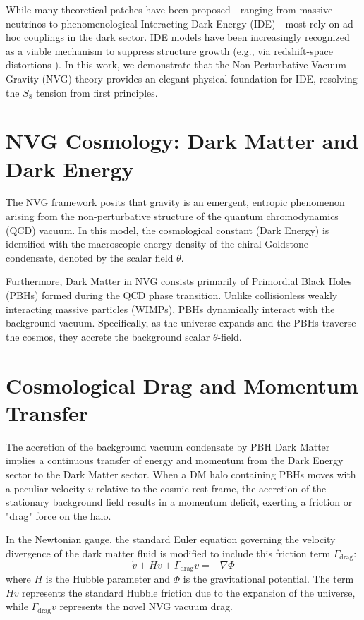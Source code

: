 \documentclass[12pt,a4paper]{article}
\begin{document}
While many theoretical patches have been proposed—ranging from massive neutrinos to phenomenological Interacting Dark Energy (IDE)—most rely on ad hoc couplings in the dark sector. IDE models have been increasingly recognized as a viable mechanism to suppress structure growth (e.g., via redshift-space distortions \cite{ide2024}). In this work, we demonstrate that the Non-Perturbative Vacuum Gravity (NVG) theory \cite{nvg2024} provides an elegant physical foundation for IDE, resolving the $S_8$ tension from first principles.

\section{NVG Cosmology: Dark Matter and Dark Energy}

The NVG framework posits that gravity is an emergent, entropic phenomenon arising from the non-perturbative structure of the quantum chromodynamics (QCD) vacuum. In this model, the cosmological constant (Dark Energy) is identified with the macroscopic energy density of the chiral Goldstone condensate, denoted by the scalar field $\theta$. 

Furthermore, Dark Matter in NVG consists primarily of Primordial Black Holes (PBHs) formed during the QCD phase transition. Unlike collisionless weakly interacting massive particles (WIMPs), PBHs dynamically interact with the background vacuum. Specifically, as the universe expands and the PBHs traverse the cosmos, they accrete the background scalar $\theta$-field.

\section{Cosmological Drag and Momentum Transfer}

The accretion of the background vacuum condensate by PBH Dark Matter implies a continuous transfer of energy and momentum from the Dark Energy sector to the Dark Matter sector. When a DM halo containing PBHs moves with a peculiar velocity $v$ relative to the cosmic rest frame, the accretion of the stationary background field results in a momentum deficit, exerting a friction or "drag" force on the halo.

In the Newtonian gauge, the standard Euler equation governing the velocity divergence of the dark matter fluid is modified to include this friction term $\Gamma_{\text{drag}}$:
\begin{equation}
    \dot{v} + H v + \Gamma_{\text{drag}} v = -\nabla \Phi
\end{equation}
where $H$ is the Hubble parameter and $\Phi$ is the gravitational potential. The term $H v$ represents the standard Hubble friction due to the expansion of the universe, while $\Gamma_{\text{drag}} v$ represents the novel NVG vacuum drag.
\end{document}
